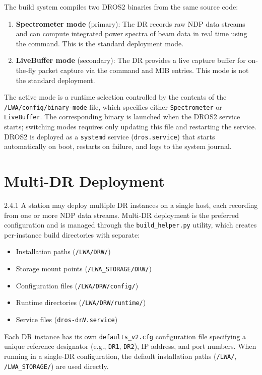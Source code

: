 The build system compiles two DROS2 binaries from the same source code:

\begin{enumerate}
    \item \textbf{Spectrometer mode} (primary): The DR records raw NDP data
          streams and can compute integrated power spectra of beam data in real
          time using the  command.  This is the standard deployment mode.
    \item \textbf{LiveBuffer mode} (secondary): The DR provides a live capture
          buffer for on-the-fly packet capture via the  command and
           MIB entries.  This mode is not the standard deployment.
\end{enumerate}

The active mode is a runtime selection controlled by the contents of the
\texttt{/LWA/config/binary-mode} file, which specifies either
\texttt{Spectrometer} or \texttt{LiveBuffer}.  The corresponding binary is
launched when the DROS2 service starts; switching modes requires only updating
this file and restarting the service.
DROS2 is deployed as a \texttt{systemd} service (\texttt{dros.service}) that
starts automatically on boot, restarts on failure, and logs to the system
journal.

\section{Multi-DR Deployment}
\label{sec:multi-dr}

\begin{newInVersion}{2.4.1}
A station may deploy multiple DR instances on a single host, each recording from
one or more NDP data streams.  Multi-DR deployment is the preferred configuration
and is managed through the \texttt{build\_helper.py} utility, which creates
per-instance build directories with separate:

\begin{itemize}
    \item Installation paths (\texttt{/LWA/DR\textit{N}/})
    \item Storage mount points (\texttt{/LWA\_STORAGE/DR\textit{N}/})
    \item Configuration files (\texttt{/LWA/DR\textit{N}/config/})
    \item Runtime directories (\texttt{/LWA/DR\textit{N}/runtime/})
    \item Service files (\texttt{dros-dr\textit{N}.service})
\end{itemize}

Each DR instance has its own \texttt{defaults\_v2.cfg} configuration file
specifying a unique reference designator (e.g., \texttt{DR1}, \texttt{DR2}),
IP address, and port numbers.  When running in a single-DR configuration, the
default installation paths (\texttt{/LWA/}, \texttt{/LWA\_STORAGE/}) are used
directly.
\end{newInVersion}


